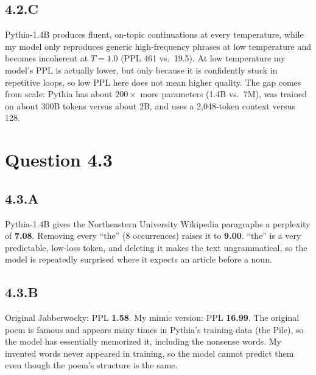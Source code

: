 \documentclass{article}
\begin{document}
\subsection*{4.2.C}
Pythia-1.4B produces fluent, on-topic continuations at every temperature, while my model only reproduces generic high-frequency phrases at low temperature and becomes incoherent at $T = 1.0$ (PPL 461 vs.\ 19.5). At low temperature my model's PPL is actually lower, but only because it is confidently stuck in repetitive loops, so low PPL here does not mean higher quality. The gap comes from scale: Pythia has about $200\times$ more parameters (1.4B vs.\ 7M), was trained on about 300B tokens versus about 2B, and uses a 2,048-token context versus 128.

\section*{Question 4.3}

\subsection*{4.3.A}
Pythia-1.4B gives the Northeastern University Wikipedia paragraphs a perplexity of \textbf{7.08}. Removing every ``the'' (8 occurrences) raises it to \textbf{9.00}. ``the'' is a very predictable, low-loss token, and deleting it makes the text ungrammatical, so the model is repeatedly surprised where it expects an article before a noun.

\subsection*{4.3.B}
Original Jabberwocky: PPL \textbf{1.58}. My mimic version: PPL \textbf{16.99}. The original poem is famous and appears many times in Pythia's training data (the Pile), so the model has essentially memorized it, including the nonsense words. My invented words never appeared in training, so the model cannot predict them even though the poem's structure is the same.
\end{document}

